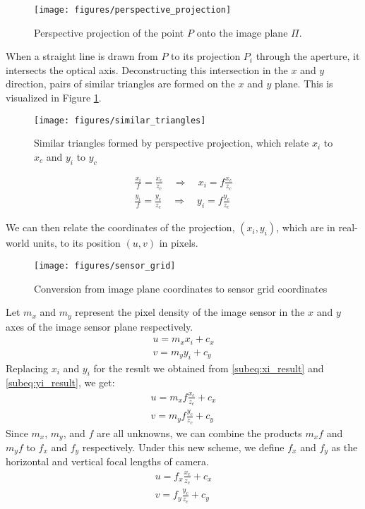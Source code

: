 \begin{figure}[H]
    \centering
    \texttt{[image: figures/perspective\_projection]}
    \caption{Perspective projection of the point $P$ onto the image plane $\Pi$.}
\end{figure}

When a straight line is drawn from $P$ to its projection $P_i$ through the aperture, it intersects the optical axis. Deconstructing this intersection in the $x$ and $y$ direction, pairs of similar triangles are formed on the $x$ and $y$ plane. This is visualized in Figure \ref{fig:similar_triangles}.
\begin{figure}[H] 
    \centering
    \texttt{[image: figures/similar\_triangles]}
    \caption{Similar triangles formed by perspective projection, which relate $x_i$ to $x_c$ and $y_i$ to $y_c$} \label{fig:similar_triangles}
\end{figure}

\begin{subequations}
    \begin{gather}
        \frac{x_i}{f} = \frac{x_c}{z_c} \quad \Longrightarrow \quad x_i = f \frac{x_c}{z_c} \label{subeq:xi_result}\\
        \frac{y_i}{f} = \frac{y_c}{z_c} \quad \Longrightarrow \quad y_i = f \frac{y_c}{z_c} \label{subeq:yi_result}
    \end{gather}
\end{subequations}

We can then relate the coordinates of the projection, $(x_i, y_i)$, which are in real-world units, to its position $(u, v)$ in pixels.
\begin{figure}[H]
    \centering
    \texttt{[image: figures/sensor\_grid]}
    \caption{Conversion from image plane coordinates to sensor grid coordinates}
\end{figure}
Let $m_x$ and $m_y$ represent the pixel density of the image sensor in the $x$ and $y$ axes of the image sensor plane respectively.
\begin{align*}
    u = m_x x_i + c_x \\
    v = m_y y_i + c_y
\end{align*}
Replacing $x_i$ and $y_i$ for the result we obtained from \ref{subeq:xi_result} and \ref{subeq:yi_result}, we get:
\begin{align*}
    u = m_x f \frac{x_c}{z_c} + c_x \\
    v = m_y f \frac{y_c}{z_c} + c_y
\end{align*}
Since $m_x$, $m_y$, and $f$ are all unknowns, we can combine the products $m_x f$ and $m_y f$ to $f_x$ and $f_y$ respectively. Under this new scheme, we define $f_x$ and $f_y$ as the horizontal and vertical focal lengths of camera.
\begin{subequations}
    \begin{gather}
        u = f_x \frac{x_c}{z_c} + c_x \\
        v = f_y \frac{y_c}{z_c} + c_y
    \end{gather}
\end{subequations}

